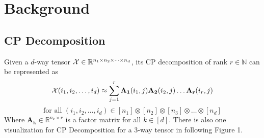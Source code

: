 \documentclass{article}
\newcommand{\mat}[1]{\mathbf{#1}}
\newcommand{\T}[2][]{#1{\mathbf{\cal{#2}}}} 						%
\begin{document}
\section{Background}
\subsection*{CP Decomposition}
Given a $d$-way tensor $\T{X} \in \mathbb{R}^{n_1\times n_2\times \dots \times n_d}$, its
CP decomposition of rank $r \in \mathbb{N}$ can be represented as 
$$\T{X}(i_1,i_2,\dots, i_d) \approx \sum^{r}_{j=1}\mat{A_1}(i_1,j)\mat{A_2}(i_2,j) \dots \mat{A_r}(i_r,j)$$
$$\text{for all } (i_1,i_2,\dots, i_d) \in [n_1] \otimes [n_2] \otimes [n_3] \otimes \dots \otimes [n_d]$$
Where $\mat{A_k} \in \mathbb{R}^{n_k \times r}$ is a factor matrix for all $k \in [d]$. There is also one visualization
for CP Decomposition for a 3-way tensor in following Figure 1.
\end{document}
